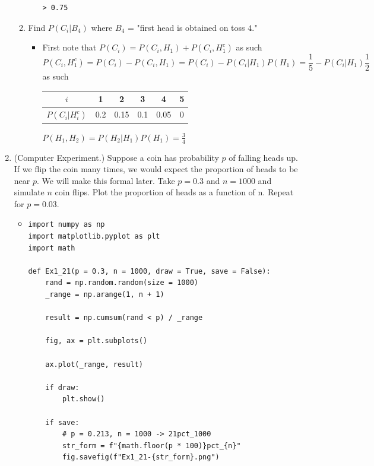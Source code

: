 \documentclass{article}
\begin{document}
\begin{enumerate}
\begin{enumerate}
\begin{itemize}
\begin{verbatim}
> 0.75
\end{verbatim}
			\end{itemize}
		\item Find $P(C_i|B_4)$ where $B_4$ = "first head is obtained on toss $4$."
			\begin{itemize}
				\item First note that $P(C_i) = P(C_i, H_1) + P(C_i, H_1^c)$ as such
				$$
				P(C_i, H_1^c) = P(C_i) - P(C_i, H_1) = P(C_i) - P(C_i|H_1)P(H_1) = \frac{1}{5} - P(C_i|H_1) \frac{1}{2}
				$$
				as such
				\begin{center}
				\begin{tabular}{|c|c|c|c|c|c|}
				\hline
				$i$ & 1 & 2 & 3 & 4 & 5 \\ 
				\hline
				$P(C_i|H_i^c)$ & 0.2 & 0.15 & 0.1 & 0.05 & 0 \\
				\hline
				\end{tabular}
				\end{center}
				$P(H_1, H_2) = P(H_2|H_1)P(H_1) = \frac{3}{4}$
			\end{itemize}
	\end{enumerate}
	\item (Computer Experiment.) Suppose a coin has probability $p$ of falling heads up. If we flip the coin many times, we would expect the proportion of heads to be near $p$. We will make this formal later. Take $p = 0.3$ and $n = 1000$ and simulate $n$ coin flips. Plot the proportion of heads as a function of n. Repeat for $p = 0.03$.
		\begin{itemize}
			\item 
\begin{verbatim}
import numpy as np
import matplotlib.pyplot as plt
import math

def Ex1_21(p = 0.3, n = 1000, draw = True, save = False):
    rand = np.random.random(size = 1000)
    _range = np.arange(1, n + 1)

    result = np.cumsum(rand < p) / _range

    fig, ax = plt.subplots()

    ax.plot(_range, result)

    if draw:
        plt.show()

    if save:
        # p = 0.213, n = 1000 -> 21pct_1000
        str_form = f"{math.floor(p * 100)}pct_{n}"
        fig.savefig(f"Ex1_21-{str_form}.png")


\end{verbatim}
\end{itemize}
\end{enumerate}
\end{document}
